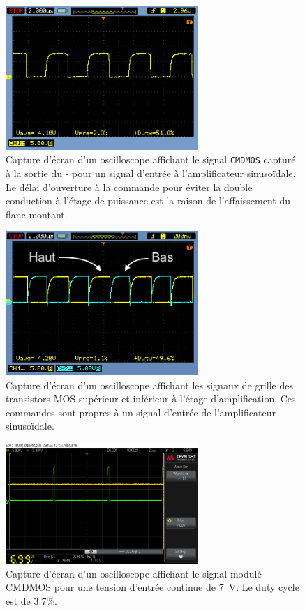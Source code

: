 \documentclass[10pt, oneside, a4paper]{article}
\begin{document}
\begin{figure}[p]
	\centering
	\includegraphics[width=0.65\textwidth]{image/osci-cmdmos.png}
	\caption{Capture d'écran d'un oscilloscope affichant le signal \texttt{CMDMOS}
			 capturé à la sortie du \Sigma{}-\Delta{} pour un signal d'entrée à
			 l'amplificateur sinusoïdale.
			 Le délai d'ouverture à la commande pour éviter la double conduction à
			 l'étage de puissance est la raison de l'affaissement du flanc montant.}
	\label{fig:osci-cmdmos}
\end{figure}

\begin{figure}[p]
	\centering
	\includegraphics[width=0.65\textwidth]{image/osci-high-low.png}
	\caption{Capture d'écran d'un oscilloscope affichant les signaux de grille des
			 transistors MOS supérieur et inférieur à l'étage d'amplification.
			 Ces commandes sont propres à un signal d'entrée de l'amplificateur
			 sinusoïdale.}
	\label{fig:osci-high-low}
\end{figure}

\begin{figure}[p]
	\centering
	\includegraphics[width=0.65\textwidth]{image/12-05/scope_2.png}
	\caption{Capture d'écran d'un oscilloscope affichant le signal modulé CMDMOS pour une
			 tension d'entrée continue de \SI{7}{\volt}. Le duty cycle est de \num{3.7}\%.}
	\label{fig:scope-2}
\end{figure}
\end{document}

